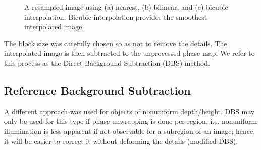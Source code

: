 \begin{figure}[h!]
	\centering
	\caption[Different types of interpolation]{A resampled image using (a) nearest, (b) bilinear, and (c) bicubic interpolation. Bicubic interpolation provides the smoothest interpolated image.}
	\label{fig:interp}
\end{figure}

The block size was carefully chosen so as not to remove the details.
The interpolated image is then subtracted to the unprocessed phase map. We refer to this process as the Direct Background Subtraction (DBS) method.

\subsection{Reference Background Subtraction}

A different approach was used for objects of nonuniform depth/height. 
DBS may only be used for this type if phase unwrapping is done per region, i.e. nonuniform illumination is less apparent if not observable for a subregion of an image; hence, it will be easier to correct it without deforming the details (modified DBS).

